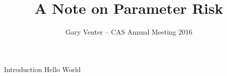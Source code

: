 \documentclass[10pt, xcolor=x11names,compress]{beamer}
\title[Recent]{A Note on Parameter Risk}
\subtitle{Gary Venter -- CAS Annual Meeting 2016}
\date{}
\renewcommand{\(}{\begin{columns}}
\renewcommand{\)}{\end{columns}}
\newcommand{\<}[1]{\begin{column}{#1}}
\renewcommand{\>}{\end{column}}
\begin{document}
\begin{frame}
\maketitle
\end{frame}
 \begin{frame}{Introduction}
Hello World
\end{frame}
\end{document}
